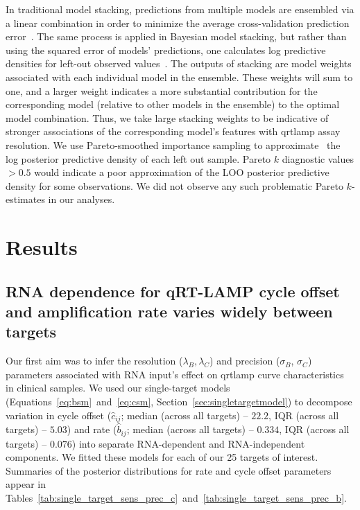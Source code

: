 \documentclass[../thesis.tex]{subfiles}
\begin{document}
In traditional model stacking, predictions from multiple models are ensembled via a linear combination in order to minimize the average cross-validation prediction error~\citep{wolpert_stacked_1992}. The same process is applied in Bayesian model stacking, but rather than using the squared error of models' predictions, one calculates log predictive densities for left-out observed values~\citep{yao_using_2018}. The outputs of stacking are model weights associated with each individual model in the ensemble. These weights will sum to one, and a larger weight indicates a more substantial contribution for the corresponding model (relative to other models in the ensemble) to the optimal model combination. Thus, we take large stacking weights to be indicative of stronger associations of the corresponding model's features with \gls{qrtlamp} assay resolution. We use Pareto-smoothed importance sampling to approximate~\citep{vehtari_practical_2017, vehtari_pareto_2021} the log posterior predictive density of each left out sample. Pareto $k$ diagnostic values $>0.5$ would indicate a poor approximation of the LOO posterior predictive density for some observations. We did not observe any such problematic Pareto $k$-estimates in our analyses.

\section{Results \label{sec:results}}

\subsection{RNA dependence for qRT-LAMP cycle offset and amplification rate varies widely between targets\label{sec:sensitivityprecision}}
Our first aim was to infer the resolution ($\lambda_B, \lambda_C$) and precision ($\sigma_{B}$, $\sigma_{C}$) parameters associated with RNA input's effect on \gls{qrtlamp} curve characteristics in clinical samples. We used our single-target models (Equations~\ref{eq:bsm}~and~\ref{eq:csm}, Section~\ref{sec:singletargetmodel}) to decompose variation in cycle offset ($\hat{c}_{ij}$; median (across all targets) -- $22.2$, IQR (across all targets) -- $5.03$) and rate ($\hat{b}_{ij}$; median (across all targets) -- $0.334$, IQR (across all targets) -- $0.076$) into separate RNA-dependent and RNA-independent components. We fitted these models for each of our 25 targets of interest. Summaries of the posterior distributions for rate and cycle offset parameters appear in Tables~\ref{tab:single_target_sens_prec_c}~and~\ref{tab:single_target_sens_prec_b}. 
\end{document}
